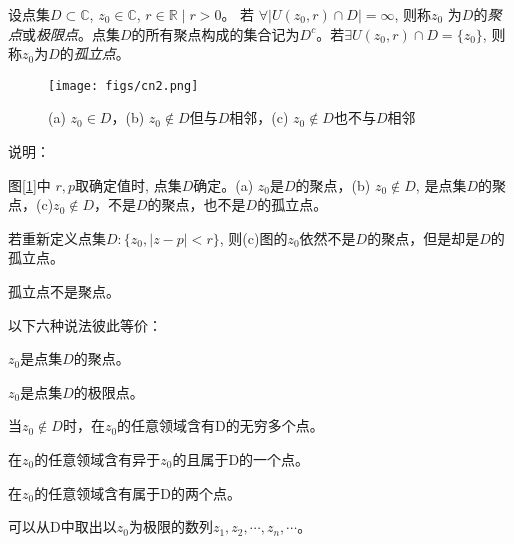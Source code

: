 \begin{definition}\label{}\index{}
	设点集$D \subset \mathbb{C}$, $z_0 \in \mathbb{C} $, $  r  \in \mathbb{R} \mid  r  > 0 $。 若 $ \forall |U(z_0,  r )\cap D| = \infty $, 则称$z_0$ 为$D$的\emph{聚点}或\emph{极限点}。点集$D$的所有聚点构成的集合记为$D^c$。若$\exists U(z_0,  r )\cap D = \{z_0 \}$, 则称$z_0$为$D$的\emph{孤立点}。
    \begin{figure}[htbp]
        \centering
        \texttt{[image: figs/cn2.png]}
        \caption{ (a) $z_0 \in D$，(b) $z_0 \notin D$但与$D$相邻，(c) $z_0 \notin D$也不与$D$相邻}
        \label{fig:jdjcd}
      \end{figure} 
\end{definition}
说明：
\begin{compactitem}
    \item 图[\ref{fig:jdjcd}]中 $r,p$取确定值时, 点集$D$确定。(a) $z_0$是$D$的聚点，(b) $z_0 \notin D$, 是点集$D$的聚点，(c)$z_0 \notin D$，不是$D$的聚点，也不是$D$的孤立点。        
    \item 若重新定义点集$D:\{ z_0, \left\vert z - p \right\vert <  r  \}$, 则(c)图的$z_0$依然不是$D$的聚点，但是却是$D$的孤立点。
    \item 孤立点不是聚点。
    \item 以下六种说法彼此等价：\\
    \begin{inparaenum}[(a)]
        \item $z_0$是点集$D$的聚点。\\
        \item $z_0$是点集$D$的极限点。\\
        \item 当$z_0 \notin D$时，在$z_0$的任意领域含有D的无穷多个点。 \\
        \item 在$z_0$的任意领域含有异于$z_0$的且属于D的一个点。 \\
        \item 在$z_0$的任意领域含有属于D的两个点。 \\
        \item 可以从D中取出以$z_0$为极限的数列$z_1, z_2, \cdots, z_n, \cdots$。
    \end{inparaenum} 
\end{compactitem}

